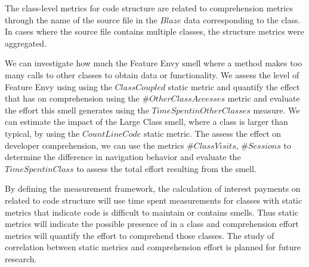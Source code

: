 The class-level metrics for code structure are related to comprehension metrics through the name of the source file in the $Blaze$ data corresponding to the class.  In cases where the source file contains multiple classes, the structure metrics were aggregated.


We can investigate how much the Feature Envy smell  where a method makes too many calls to other classes to obtain data or functionality.  We assess the level of Feature Envy using using the $Class Coupled$ static metric and quantify the effect that has on comprehension using the $\# Other Class Accesses$ metric and evaluate the effort this smell generates using the $Time Spent in Other Classes$ measure.  
We can estimate the impact of the Large Class smell, where a class is larger than typical, by using the $Count Line Code$ static metric.  The assess the effect on developer comprehension, we can use the metrics $\# Class Visits$, $\# Sessions$ to determine the difference in navigation behavior and evaluate the $Time Spent in Class$ to assess the total effort resulting from the smell.

By defining the measurement framework, the calculation of interest payments on \TD related to code structure will use time spent measurements for classes with static metrics that indicate code is difficult to maintain or contains smells.  Thus static metrics will indicate the possible presence of \TD in a class and comprehension effort metrics will quantify the effort to comprehend those classes. The study of correlation between static metrics and comprehension effort is planned for future research.



